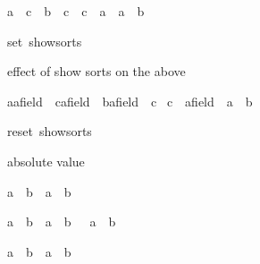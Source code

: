 \begin{isabellebody}
\begin{isamarkuptext}
\begin{isabelle}%
{\isacharparenleft}a\ {\isacharasterisk}\ c\ {\isacharequal}\ b\ {\isacharasterisk}\ c{\isacharparenright}\ {\isacharequal}\ {\isacharparenleft}c\ {\isacharequal}\ {\isacharparenleft}{}{\isasymColon}{\isacharprime}a{\isacharparenright}\ {\isasymor}\ a\ {\isacharequal}\ b{\isacharparenright}%
\end{isabelle}
%
\end{isamarkuptext}%
\isamarkuptrue%
set\ show{\isacharunderscore}sorts{\isacharasterisk}{\isacharbraceright}\isamarkupfalse%
%
\begin{isamarkuptext}%
effect of show sorts on the above

\begin{isabelle}%
{\isacharparenleft}{\isacharparenleft}a{\isasymColon}{\isacharprime}a{\isasymColon}field{\isacharparenright}\ {\isacharasterisk}\ {\isacharparenleft}c{\isasymColon}{\isacharprime}a{\isasymColon}field{\isacharparenright}\ {\isacharequal}\ {\isacharparenleft}b{\isasymColon}{\isacharprime}a{\isasymColon}field{\isacharparenright}\ {\isacharasterisk}\ c{\isacharparenright}\ {\isacharequal}\isanewline
{\isacharparenleft}c\ {\isacharequal}\ {\isacharparenleft}{}{\isasymColon}{\isacharprime}a{\isasymColon}field{\isacharparenright}\ {\isasymor}\ a\ {\isacharequal}\ b{\isacharparenright}%
\end{isabelle}
%
\end{isamarkuptext}%
\isamarkuptrue%
reset\ show{\isacharunderscore}sorts{\isacharasterisk}{\isacharbraceright}\isamarkupfalse%
%
\begin{isamarkuptext}%
absolute value

\begin{isabelle}%
{\isasymbar}a\ {\isacharasterisk}\ b{\isasymbar}\ {\isacharequal}\ {\isasymbar}a{\isasymbar}\ {\isacharasterisk}\ {\isasymbar}b{\isasymbar}%
\end{isabelle}

\begin{isabelle}%
{\isacharparenleft}{\isasymbar}a{\isasymbar}\ {\isasymle}\ b{\isacharparenright}\ {\isacharequal}\ {\isacharparenleft}a\ {\isasymle}\ b\ {\isasymand}\ {\isacharminus}\ a\ {\isasymle}\ b{\isacharparenright}%
\end{isabelle}

\begin{isabelle}%
{\isasymbar}a\ {\isacharplus}\ b{\isasymbar}\ {\isasymle}\ {\isasymbar}a{\isasymbar}\ {\isacharplus}\ {\isasymbar}b{\isasymbar}%
\end{isabelle}


\end{isamarkuptext}
\end{isabellebody}
